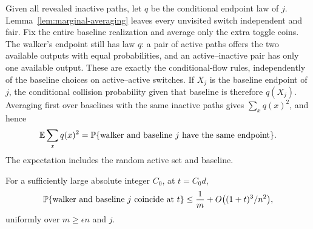 Given all revealed inactive paths, let $q$ be the conditional endpoint
law of $j$. Lemma~\ref{lem:marginal-averaging} leaves every unvisited
switch independent and fair. Fix the entire baseline realization and
average only the extra toggle coins. The walker's endpoint still has
law $q$: a pair of active paths
offers the two available outputs with equal probabilities, and an
active--inactive pair has only one available output. These are exactly
the conditional-flow rules, independently of the baseline choices on
active--active switches. If $X_j$ is the baseline endpoint of $j$,
the conditional collision probability given that baseline is therefore
$q(X_j)$. Averaging first over baselines with the same inactive paths
gives $\sum_xq(x)^2$, and hence
\begin{equation}
 \mathbb E\sum_xq(x)^2
 =\mathbb P\{\hbox{walker and baseline }j
                    \hbox{ have the same endpoint}\}.
 \label{eq:c-baseline-collision-identity}
\end{equation}
The expectation includes the random active set and baseline.

\begin{lemma}
\label{lem:c-baseline-coincidence}
For a sufficiently large absolute integer $C_0$, at $t=C_0d$,
\begin{equation}
 \mathbb P\{\hbox{walker and baseline }j\hbox{ coincide at }t\}
 \le \frac1m+O\bigl((1+t)^3/n^2\bigr),
 \label{eq:c-baseline-coincidence}
\end{equation}
uniformly over $m\ge\epsilon n$ and $j$.
\end{lemma}

